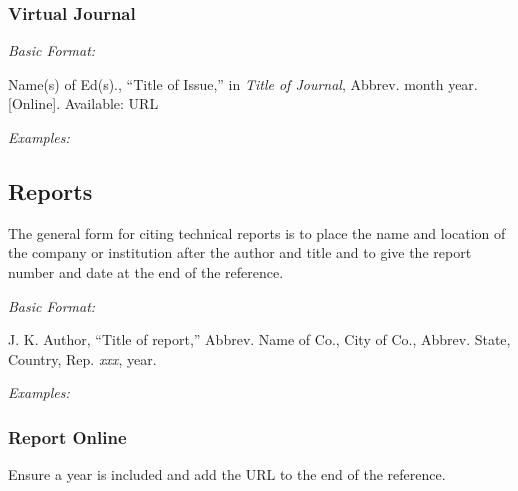 \documentclass[10pt]{article}
\newcommand*{\guidelabel}[1]{\par\vspace{-4pt}\hspace*{22pt}\textit{#1}\par\vspace{-\parskip}}
\begin{document}
\subsubsection{Virtual Journal}
\guidelabel{Basic Format:}
\begin{guideitems}
  \item Name(s) of Ed(s)., “Title of Issue,” in \textit{Title of Journal}, Abbrev. month year. [Online]. Available: URL
\end{guideitems}
\guidelabel{Examples:}
\begin{guideitems}
  \item {}
  \item {}
  \item {}
\end{guideitems}

\subsection{Reports}

The general form for citing technical reports is to place the name and location of the company or institution after the author and title and to give the report number and date at the end of the reference.

\guidelabel{Basic Format:}
\begin{guideitems}
  \item J. K. Author, “Title of report,” Abbrev. Name of Co., City of Co., Abbrev. State, Country, Rep. \textit{xxx}, year.
\end{guideitems}
\guidelabel{Examples:}
\begin{guideitems}
  \item {}
  \item {}
  \item {}
  \item {}
  \item {}
\end{guideitems}

\subsubsection{Report Online}

Ensure a year is included and add the URL to the end of the reference.
\end{document}
